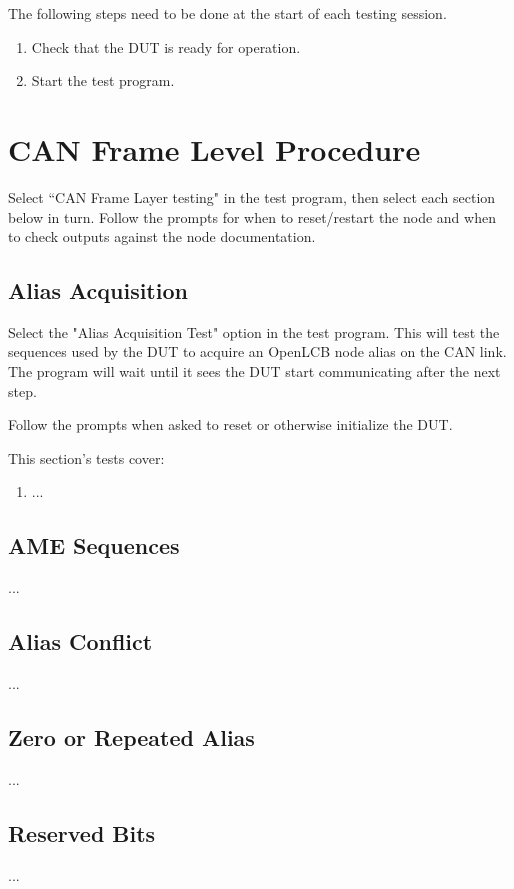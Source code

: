 \documentclass[11pt]{article}
\begin{document}
The following steps need to be done at the start of each testing session.
\begin{enumerate}
\item Check that the DUT is ready for operation.
\item Start the test program.
\end{enumerate}

\section{CAN Frame Level Procedure}

Select ``CAN Frame Layer testing" in the test program, 
then select each section below in turn.  Follow the prompts
for when to reset/restart the node and when to check 
outputs against the node documentation.

\subsection{Alias Acquisition}
Select the "Alias Acquisition Test" option in the test program. 
This will test the sequences used by the DUT to acquire an OpenLCB node alias on the CAN link. 
The program will wait until it sees the DUT start communicating after the next step.

Follow the prompts when asked to reset or otherwise initialize the DUT.

This section's tests cover:

\begin{enumerate}
\item ...
\end{enumerate}


\subsection{AME Sequences}

...

\subsection{Alias Conflict}

...

\subsection{Zero or Repeated Alias}

...

\subsection{Reserved Bits}

...
\end{document}
